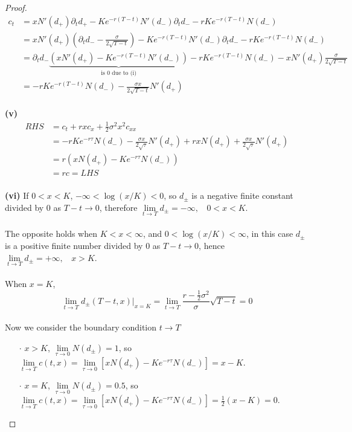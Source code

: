 \documentclass[a4paper, 10pt]{article}
\theoremstyle{definition}
\theoremstyle{hSol}
\begin{document}
\begin{proof}
$$$$
\begin{equation}
	\begin{split}
		c_t &= xN'(d_+)\partial_t d_+ - Ke^{-r(T-t)}N'(d_-)\partial_t d_- - rKe^{-r(T-t)}N(d_-)\\
		&= xN'(d_+)\left(\partial_t d_- - \frac{\sigma}{2\sqrt{T-t}}\right) - Ke^{-r(T-t)}N'(d_-)\partial_t d_- - rKe^{-r(T-t)}N(d_-)\\
		&= \partial_t d_-\underbrace{\left(xN'(d_+)-Ke^{-r(T-t)}N'(d_-)\right)}_{\text{is 0 due to (i)} } -rKe^{-r(T-t)}N(d_-)- xN'(d_+)\frac{\sigma}{2\sqrt{T-t}} \\
		&=  -rKe^{-r(T-t)}N(d_-)- \frac{\sigma x}{2\sqrt{T-t}} N'(d_+)
	\end{split}
\end{equation}
~\\
\textbf{(v)}
\begin{equation}
	\begin{split}
		RHS &= c_t + rxc_x + \frac{1}{2}\sigma^2 x^2 c_{xx} \\
		&= -rKe^{-r\tau}N(d_-)- \frac{\sigma x}{2\sqrt{\tau}} N'(d_+)+rxN(d_+) + \frac{\sigma x}{2\sqrt{\tau}}N'(d_+) \\
		&= r(xN(d_+)-Ke^{-r\tau} N(d_-))\\
		&= rc = LHS
	\end{split}
\end{equation}
~\\
\textbf{(vi)} If $0<x<K$, $-\infty<\log(x/K)<0$, so $d_{\pm}$ is a negative finite constant divided by $0$ as $T-t\to 0$, therefore $\lim\limits_{t\rightarrow T} d_{\pm} = -\infty,~~~~0<x<K$.\\
~\\
The opposite holds when $K<x<\infty$, and $0<\log(x/K)<\infty$, in this case $d_{\pm}$ is a positive finite number divided by $0$ as $T-t\to 0$, hence $\lim\limits_{t\rightarrow T} d_{\pm} = +\infty,~~~~x>K$. \\
~\\
When $x=K$, 
$$
\lim\limits_{t\rightarrow T}d_{\pm}(T-t, x)\biggr\rvert_{x=K} = \lim\limits_{t\rightarrow T}\frac{r-\frac{1}{2}\sigma^2}{\sigma}\sqrt{T-t} = 0
$$
~\\
Now we consider the boundary condition $t\to T$
\begin{itemize}
	\item[$\cdot$] $x>K$, $\lim\limits_{\tau\rightarrow 0}N(d_{\pm}) = 1$, so $\lim\limits_{t\rightarrow T} c(t,x) = \lim\limits_{\tau \rightarrow 0} [xN(d_+)-Ke^{-r\tau}N(d_-)] = x-K$.
	\item[$\cdot$] $x=K$, $\lim\limits_{\tau\rightarrow 0}N(d_{\pm}) = 0.5$, so $\lim\limits_{t\rightarrow T} c(t,x) = \lim\limits_{\tau \rightarrow 0} [xN(d_+)-Ke^{-r\tau}N(d_-)] = \frac{1}{2}(x-K)=0$.

\end{itemize}
\end{proof}
\end{document}
